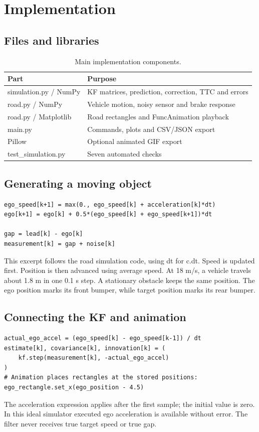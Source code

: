 \documentclass[11pt,a4paper]{article}
\begin{document}
\clearpage\section{Implementation}
\subsection{Files and libraries}
\begin{table}[H]\centering\caption{Main implementation components.}\small\renewcommand{\arraystretch}{1.2}\begin{tabularx}{\linewidth}{YY}\toprule
\textbf{Part} & \textbf{Purpose} \\
\midrule
simulation.py / NumPy & KF matrices, prediction, correction, TTC and errors \\
road.py / NumPy & Vehicle motion, noisy sensor and brake response \\
road.py / Matplotlib & Road rectangles and FuncAnimation playback \\
main.py & Commands, plots and CSV/JSON export \\
Pillow & Optional animated GIF export \\
test\_\allowbreak{}simulation.py & Seven automated checks \\
\bottomrule\end{tabularx}\end{table}
\subsection{Generating a moving object}
\begin{lstlisting}
ego_speed[k+1] = max(0., ego_speed[k] + acceleration[k]*dt)
ego[k+1] = ego[k] + 0.5*(ego_speed[k] + ego_speed[k+1])*dt

gap = lead[k] - ego[k]
measurement[k] = gap + noise[k]
\end{lstlisting}
This excerpt follows the road simulation code, using dt for c.dt. Speed is updated first. Position is then advanced using average speed. At 18 m/s, a vehicle travels about 1.8 m in one 0.1 s step. A stationary obstacle keeps the same position. The ego position marks its front bumper, while target position marks its rear bumper.\par

\subsection{Connecting the KF and animation}
\begin{lstlisting}
actual_ego_accel = (ego_speed[k] - ego_speed[k-1]) / dt
estimate[k], covariance[k], innovation[k] = (
    kf.step(measurement[k], -actual_ego_accel)
)
# Animation places rectangles at the stored positions:
ego_rectangle.set_x(ego_position - 4.5)
\end{lstlisting}
The acceleration expression applies after the first sample; the initial value is zero. In this ideal simulator executed ego acceleration is available without error. The filter never receives true target speed or true gap.\par
\end{document}
